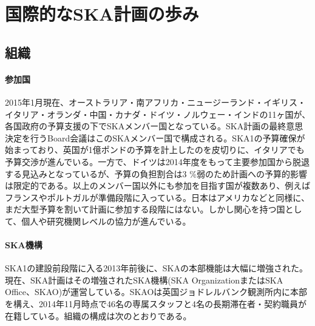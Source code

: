 \setcounter{section}{1}\section{国際的なSKA計画の歩み}
\label{c01.s2}

\subsection{組織}
\label{c01.s2.ss1}

\paragraph{参加国}

2015年1月現在、オーストラリア・南アフリカ・ニュージーランド・イギリス・イタリア・オランダ・中国・カナダ・ドイツ・ノルウェー・インドの11ヶ国が、各国政府の予算支援の下でSKAメンバー国となっている。SKA計画の最終意思決定を行うBoard会議はこのSKAメンバー国で構成される。SKA1の予算確保が始まっており、英国が1億ポンドの予算を計上したのを皮切りに、イタリアでも予算交渉が進んでいる。一方で、ドイツは2014年度をもって主要参加国から脱退する見込みとなっているが、予算の負担割合は3 \%弱のため計画への予算的影響は限定的である。以上のメンバー国以外にも参加を目指す国が複数あり、例えばフランスやポルトガルが準備段階に入っている。日本はアメリカなどと同様に、まだ大型予算を割いて計画に参加する段階にはない。しかし関心を持つ国として、個人や研究機関レベルの協力が進んでいる。

\paragraph{SKA機構}

SKA1の建設前段階に入る2013年前後に、SKAの本部機能は大幅に増強された。現在、SKA計画はその増強されたSKA機構(SKA OrganizationまたはSKA Office、SKAO)が運営している。SKAOは英国ジョドレルバンク観測所内に本部を構え、2014年11月時点で46名の専属スタッフと4名の長期滞在者・契約職員が在籍している。組織の構成は次のとおりである。

